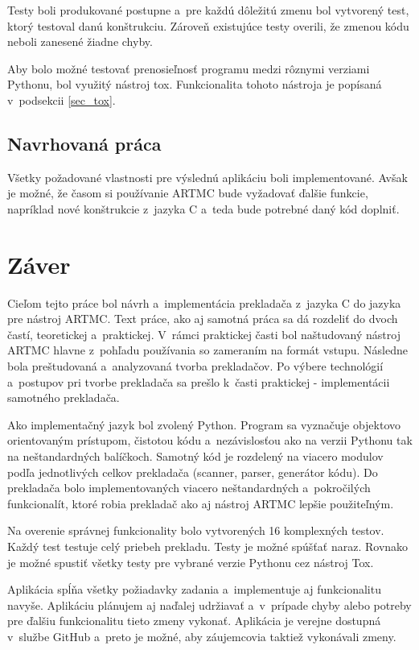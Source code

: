 Testy boli produkované postupne a~pre každú dôležitú zmenu bol vytvorený test, ktorý testoval danú konštrukciu. Zároveň existujúce testy overili, že zmenou kódu neboli zanesené žiadne chyby.

Aby bolo možné testovať prenosieľnosť programu medzi rôznymi verziami Pythonu, bol využitý nástroj tox. Funkcionalita tohoto nástroja je popísaná v~podsekcii \ref{sec_tox}.

\section{Navrhovaná práca}
Všetky požadované vlastnosti pre výslednú aplikáciu boli implementované. Avšak je možné, že časom si používanie ARTMC bude vyžadovať ďalšie funkcie, napríklad nové konštrukcie z~jazyka C a~teda bude potrebné daný kód doplniť.

\chapter{Záver}
Cieľom tejto práce bol návrh a~implementácia prekladača z~jazyka C do jazyka pre nástroj ARTMC. Text práce, ako aj samotná práca sa dá rozdeliť do dvoch častí, teoretickej a~praktickej. V~rámci praktickej časti bol naštudovaný nástroj ARTMC hlavne  z~pohľadu používania so zameraním na formát vstupu. Následne bola preštudovaná a~analyzovaná tvorba prekladačov. Po výbere technológií a~postupov pri tvorbe prekladača sa prešlo k~časti praktickej - implementácii samotného prekladača.

Ako implementačný jazyk bol zvolený Python. Program sa vyznačuje objektovo orientovaným prístupom, čistotou kódu a~nezávislosťou ako na verzii Pythonu tak na neštandardných balíčkoch. Samotný kód je rozdelený na viacero modulov podľa jednotlivých celkov prekladača (scanner, parser, generátor kódu). Do prekladača bolo implementovaných viacero neštandardných a~pokročilých funkcionalít, ktoré robia prekladač ako aj nástroj ARTMC lepšie použiteľným.

Na overenie správnej funkcionality bolo vytvorených 16 komplexných testov. Každý test testuje celý priebeh prekladu. Testy je možné spúšťať naraz. Rovnako je možné spustiť všetky testy pre vybrané verzie Pythonu cez nástroj Tox.

Aplikácia spĺňa všetky požiadavky zadania a~implementuje aj funkcionalitu navyše. Aplikáciu plánujem aj naďalej udržiavať a~v~prípade chyby alebo potreby pre ďalšiu funkcionalitu tieto zmeny vykonať. Aplikácia je verejne dostupná v~službe GitHub a~preto je možné, aby záujemcovia taktiež vykonávali zmeny.


